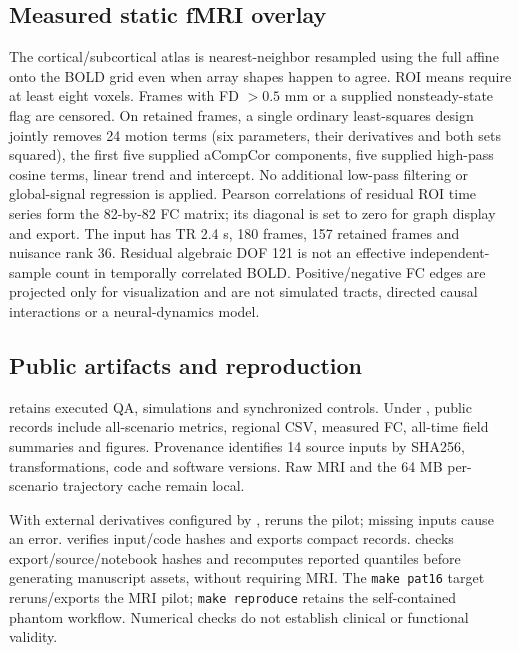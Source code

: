 \subsection{Measured static fMRI overlay}
The cortical/subcortical atlas is nearest-neighbor resampled using the full affine onto the BOLD grid even when array shapes happen to agree. ROI means require at least eight voxels. Frames with FD $>0.5$ mm or a supplied nonsteady-state flag are censored. On retained frames, a single ordinary least-squares design jointly removes 24 motion terms (six parameters, their derivatives and both sets squared), the first five supplied aCompCor components, five supplied high-pass cosine terms, linear trend and intercept. No additional low-pass filtering or global-signal regression is applied. Pearson correlations of residual ROI time series form the 82-by-82 FC matrix; its diagonal is set to zero for graph display and export. The input has TR 2.4 s, 180 frames, 157 retained frames and nuisance rank 36. Residual algebraic DOF 121 is not an effective independent-sample count in temporally correlated BOLD. Positive/negative FC edges are projected only for visualization and are not simulated tracts, directed causal interactions or a neural-dynamics model.

\subsection{Public artifacts and reproduction}
 retains executed QA, simulations and synchronized controls. Under , public records include all-scenario metrics, regional CSV, measured FC, all-time field summaries and figures. Provenance identifies 14 source inputs by SHA256, transformations, code and software versions. Raw MRI and the 64 MB per-scenario trajectory cache remain local.

With external derivatives configured by ,  reruns the pilot; missing inputs cause an error.  verifies input/code hashes and exports compact records.  checks export/source/notebook hashes and recomputes reported quantiles before generating manuscript assets, without requiring MRI. The \texttt{make pat16} target reruns/exports the MRI pilot; \texttt{make reproduce} retains the self-contained phantom workflow. Numerical checks do not establish clinical or functional validity.
